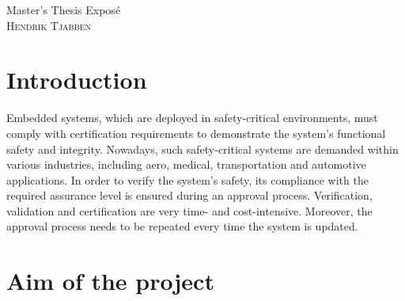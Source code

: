 \documentclass[a4paper, 12pt]{scrartcl}
\begin{document}
\begin{center}
  \Huge{Master's Thesis Expos\'{e}}\\
  \large{\textsc{Hendrik Tjabben}}
\end{center}


\section*{Introduction}

Embedded systems, which are deployed in safety-critical environments, must comply with certification requirements to demonstrate the system's functional safety and integrity.
Nowadays, such safety-critical systems are demanded within various industries, including aero, medical, transportation and automotive applications.
In order to verify the system's safety, its compliance with the required assurance level is ensured during an approval process.
Verification, validation and certification are very time- and cost-intensive.
Moreover, the approval process needs to be repeated every time the system is updated.


\section*{Aim of the project}
\end{document}
